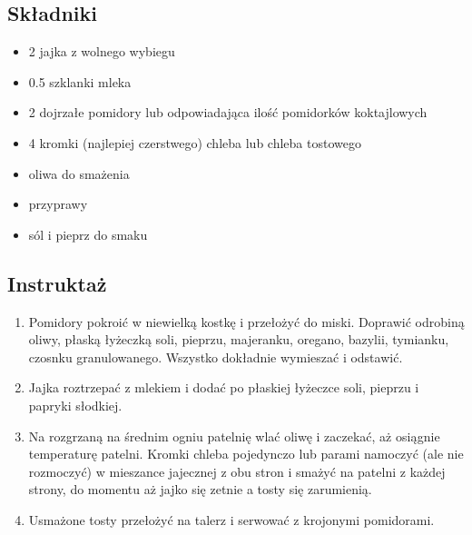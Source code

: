 \documentclass[a4paper,10pt]{book}
\begin{document}
\begin{multicols}{2}

\subsection*{Składniki}
\begin{itemize}
    \item 2 jajka z wolnego wybiegu
    \item 0.5 szklanki mleka
    \item 2 dojrzałe pomidory lub odpowiadająca ilość pomidorków koktajlowych
    \item 4 kromki (najlepiej czerstwego) chleba lub chleba tostowego
    \item oliwa do smażenia
    \item przyprawy
    \item sól i pieprz do smaku
\end{itemize}

\columnbreak

\begin{figure}[H]
    \centering
\end{figure}

\end{multicols}

\vspace{0.5cm} 

\subsection*{Instruktaż}
\begin{enumerate}
    \item Pomidory pokroić w niewielką kostkę i przełożyć do miski. Doprawić odrobiną oliwy, płaską łyżeczką soli, pieprzu, majeranku, oregano, bazylii, tymianku, czosnku granulowanego. Wszystko dokładnie wymieszać i odstawić.
    \item Jajka roztrzepać z mlekiem i dodać po płaskiej łyżeczce soli, pieprzu i papryki słodkiej.
    \item Na rozgrzaną na średnim ogniu patelnię wlać oliwę i zaczekać, aż osiągnie temperaturę patelni. Kromki chleba pojedynczo lub parami namoczyć (ale nie rozmoczyć) w mieszance jajecznej z obu stron i smażyć na patelni z każdej strony, do momentu aż jajko się zetnie a tosty się zarumienią.
    \item Usmażone tosty przełożyć na talerz i serwować z krojonymi pomidorami.
\end{enumerate}
\end{document}
